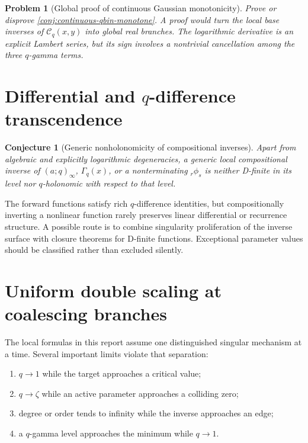 \documentclass[11pt,a4paper,oneside,openany]{book}
\newtheorem{conjecture}[theorem]{Conjecture}
\newtheorem{problem}[theorem]{Problem}
\theoremstyle{definition}
\theoremstyle{remark}
\begin{document}
\begin{problem}[Global proof of continuous Gaussian monotonicity]
Prove or disprove \cref{conj:continuous-qbin-monotone}.  A proof would turn
the local base inverses of \(\mathcal C_q(x,y)\) into global real branches.
The logarithmic derivative is an explicit Lambert series, but its sign
involves a nontrivial cancellation among the three \(q\)-gamma terms.
\end{problem}

\section{Differential and \texorpdfstring{$q$}{q}-difference transcendence}

\begin{conjecture}[Generic nonholonomicity of compositional inverses]
Apart from algebraic and explicitly logarithmic degeneracies, a generic local
compositional inverse of \((a;q)_\infty\), \(\Gamma_q(x)\), or a
nonterminating \({}_r\phi_s\) is neither D-finite in its level nor
\(q\)-holonomic with respect to that level.
\end{conjecture}

The forward functions satisfy rich \(q\)-difference identities, but
compositionally inverting a nonlinear function rarely preserves linear
differential or recurrence structure.  A possible route is to combine
singularity proliferation of the inverse surface with closure theorems for
D-finite functions.  Exceptional parameter values should be classified rather
than excluded silently.

\section{Uniform double scaling at coalescing branches}

The local formulas in this report assume one distinguished singular
mechanism at a time.  Several important limits violate that separation:
\begin{enumerate}[label=\textup{(\roman*)}]
\item \(q\to1\) while the target approaches a critical value;
\item \(q\to\zeta\) while an active parameter approaches a colliding zero;
\item degree or order tends to infinity while the inverse approaches an edge;
\item a \(q\)-gamma level approaches the minimum while \(q\to1\).
\end{enumerate}
\end{document}
